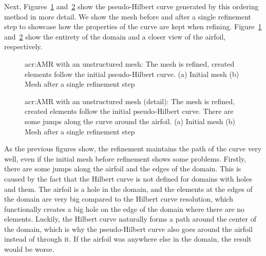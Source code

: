 Next, Figures~\ref{fig:mesh_P0_adaptivity_far} and~\ref{fig:mesh_P0_adaptivity_near} show the
pseudo-Hilbert curve generated by this ordering method in more detail. We show the mesh before and
after a single refinement step to showcase how the properties of the curve are kept when refining.
Figure~\ref{fig:mesh_P0_adaptivity_far} and~\ref{fig:mesh_P0_adaptivity_near} show the entirety of
the domain and a closer view of the airfoil, respectively.

\begin{figure}[H]
    \centering
    \caption{\Acrlong{acr:AMR} with an unstructured mesh: The mesh is refined, created elements follow the initial pseudo-Hilbert curve. (a) Initial mesh (b) Mesh after a single refinement step}\label{fig:mesh_P0_adaptivity_far}
\end{figure}

\begin{figure}[H]
    \centering
    \caption{\Acrlong{acr:AMR} with an unstructured mesh (detail): The mesh is refined, created
        elements follow the initial pseudo-Hilbert curve. There are some jumps along the curve 
        around the airfoil. (a) Initial mesh (b) Mesh after a single refinement 
        step}\label{fig:mesh_P0_adaptivity_near}
\end{figure}

As the previous figures show, the refinement maintains the path of the curve very well, even if the
initial mesh before refinement shows some problems. Firstly, there are some jumps along the airfoil
and the edges of the domain. This is caused by the fact that the Hilbert curve is not defined for
domains with holes and them. The airfoil is a hole in the domain, and the elements at the edges of
the domain are very big compared to the Hilbert curve resolution, which functionally creates a big
hole on the edge of the domain where there are no elements. Luckily, the Hilbert curve naturally
forms a path around the center of the domain, which is why the pseudo-Hilbert curve also goes around
the airfoil instead of through it. If the airfoil was anywhere else in the domain, the result would
be worse.

